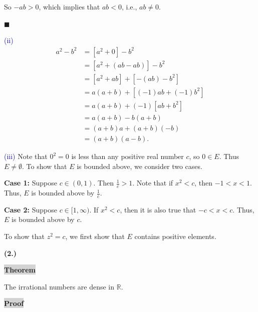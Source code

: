 \documentclass[12pt]{article}
\newcommand{\mybox}{%
    \collectbox{%
        \setlength{\fboxsep}{2pt}%
        \fbox{\BOXCONTENT}%
    }%
}
\begin{document}
\noindent So $-ab > 0$, which implies that $ab < 0$, i.e., $ab\neq 0$.

\hfill$\blacksquare$

\vspace{5mm}

\noindent \textcolor{blue}{(ii)} 
\begin{align*}
a^2 - b^2 &= [a^2 + 0] - b^2 \\
&=[a^2 +(ab-ab)] - b^2 \\
&=[a^2+ab] + [-(ab)-b^2] \\
&=a(a+b) + [(-1)ab + (-1)b^2] \\
&=a(a+b) + (-1)[ab+b^2] \\
&=a(a+b) - b(a+b) \\
&=(a+b)a+(a+b)(-b) \\
&=(a+b)(a-b).
\end{align*}

\vspace{5mm}

\noindent \textcolor{blue}{(iii)} Note that $0^2 = 0$ is less than any positive real number $c$, so $0\in E$. Thus $E\neq\emptyset$. To show that $E$ is bounded above, we consider two cases. 

\noindent\textbf{Case 1:} Suppose $c \in (0,1)$. Then $\frac{1}{c} > 1.$ Note that if $x^2 < c$, then $-1 < x < 1$. Thus, $E$ is bounded above by $\frac{1}{c}.$ 

\vspace{3mm}

\noindent\textbf{Case 2:} Suppose $c\in [1,\infty).$ If $x^2 < c$, then it is also true that $-c < x < c.$ Thus, $E$ is bounded above by $c$.

\vspace{3mm}

\noindent To show that $z^2 = c$, we first show that $E$ contains positive elements. 

\pagebreak

\noindent \textbf{(2.)} 

\vspace{3mm}

\noindent\mybox{\colorbox{lightgray}{\textbf{Theorem}}}\hspace{3mm}\hrulefill 

\noindent The irrational numbers are dense in $\mathbb{R}$. 

\vspace{5mm}

\noindent\mybox{\colorbox{lightgray}{\textbf{Proof}}}\hspace{3mm}\hrulefill
\end{document}
